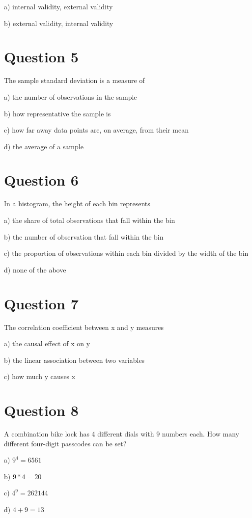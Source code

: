 \documentclass[11pt]{article}
\begin{document}
a) internal validity, external validity

b) external validity, internal validity

\section*{Question 5}
\label{sec:orga00e631}

The sample standard deviation is a measure of

a) the number of observations in the sample

b) how representative the sample is

c) how far away data points are, on average, from their mean

d) the average of a sample


\section*{Question 6}
\label{sec:org54e9836}
In a histogram, the height of each bin represents

a) the share of total observations that fall within the bin

b) the number of observation that fall within the bin

c) the proportion of observations within each bin divided by the width of the bin

d) none of the above

\section*{Question 7}
\label{sec:orgd9d53e0}
The correlation coefficient between x and y measures

a) the causal effect of x on y

b) the linear association between two variables

c) how much y causes x


\section*{Question 8}
\label{sec:orgede4d5b}

A combination bike lock has 4 different dials with 9 numbers each. How many different four-digit passcodes can be set?

a) \(9^4 =  6561\)

b) \(9*4 = 20\)

c) \(4^9 = 262144\)

d) \(4+9 = 13\)
\end{document}
